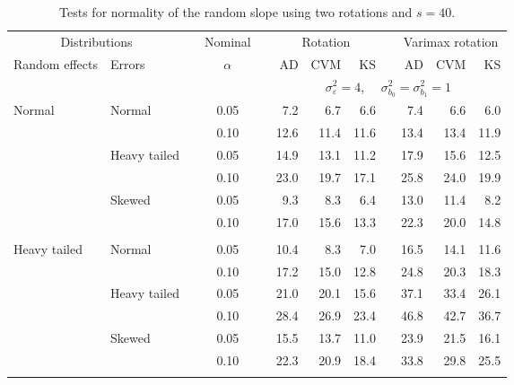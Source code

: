 \begin{table}[ht]
\caption{\label{tab:simb1s40-alt}Tests for normality of the random slope using two rotations and $s = 40$.}
\begin{scriptsize}
\begin{center}
\begin{tabular}{ll p{.1cm} c p{.1cm} rrr p{.1cm} rrr}
  \hline
  \multicolumn{2}{c}{Distributions}& & Nominal & &  \multicolumn{3}{c}{Rotation} & & \multicolumn{3}{c}{Varimax rotation} \\ \cline{1-2} \cline{6-8} \cline{10-12}   
  Random effects & Errors & & $\alpha$ & & AD & CVM & KS & & AD & CVM & KS \\ 
   \hline
& && && \multicolumn{7}{c}{$\sigma_{\varepsilon}^2 = 4$, \ \ $\sigma_{b_0}^2 = \sigma_{b_1}^2 = 1$} \\ \cline{6-12}
\rowcolor{gray!20}Normal       & Normal       && 0.05 &&   7.2 & 6.7 & 6.6 &   & 7.4 & 6.6 & 6.0 \\ 
\rowcolor{gray!20}             &              && 0.10 &&   12.6 & 11.4 & 11.6 &   & 13.4 & 13.4 & 11.9 \\ 
\rowcolor{gray!20}             & Heavy tailed && 0.05 &&   14.9 & 13.1 & 11.2 &   & 17.9 & 15.6 & 12.5 \\ 
\rowcolor{gray!20}             &              && 0.10 &&   23.0 & 19.7 & 17.1 &   & 25.8 & 24.0 & 19.9 \\ 
\rowcolor{gray!20}             & Skewed       && 0.05 &&   9.3 & 8.3 & 6.4 &   & 13.0 & 11.4 & 8.2 \\ 
\rowcolor{gray!20}             &              && 0.10 &&   17.0 & 15.6 & 13.3 &   & 22.3 & 20.0 & 14.8 \\ 
&&&&&&&&&&&\\
Heavy tailed & Normal       && 0.05 &&   10.4 & 8.3 & 7.0 &   & 16.5 & 14.1 & 11.6 \\ 
             &              && 0.10 &&   17.2 & 15.0 & 12.8 &   & 24.8 & 20.3 & 18.3 \\ 
             & Heavy tailed && 0.05 &&   21.0 & 20.1 & 15.6 &   & 37.1 & 33.4 & 26.1 \\ 
             &              && 0.10 &&   28.4 & 26.9 & 23.4 &   & 46.8 & 42.7 & 36.7 \\ 
             & Skewed       && 0.05 &&   15.5 & 13.7 & 11.0 &   & 23.9 & 21.5 & 16.1 \\ 
             &              && 0.10 &&   22.3 & 20.9 & 18.4 &   & 33.8 & 29.8 & 25.5 \\ 
&&&&&&&&&&&\\

\end{tabular}
\end{center}
\end{scriptsize}
\end{table}
